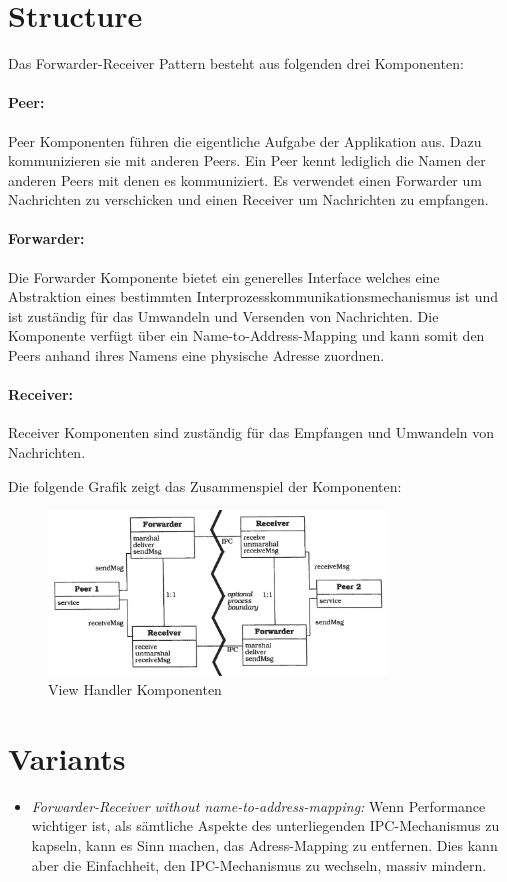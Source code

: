 \section{Structure}
Das Forwarder-Receiver Pattern besteht aus folgenden drei Komponenten:
\paragraph{Peer:} Peer Komponenten führen die eigentliche Aufgabe der Applikation aus. Dazu kommunizieren sie mit anderen Peers. Ein Peer kennt lediglich die Namen der anderen Peers mit denen es kommuniziert. Es verwendet einen Forwarder um Nachrichten zu verschicken und einen Receiver um Nachrichten zu empfangen.

\paragraph{Forwarder:} Die Forwarder Komponente bietet ein generelles Interface welches eine Abstraktion eines bestimmten Interprozesskommunikationsmechanismus ist und ist zuständig für das Umwandeln und Versenden von Nachrichten. Die Komponente verfügt über ein Name-to-Address-Mapping und kann somit den Peers anhand ihres Namens eine physische Adresse zuordnen.

\paragraph{Receiver:} Receiver Komponenten sind zuständig für das Empfangen und Umwandeln von Nachrichten.

\medskip
Die folgende Grafik zeigt das Zusammenspiel der Komponenten:
\begin{figure}[H]
	\centering
	\includegraphics[width=0.8\textwidth]{figures/11-forwarder-receiver-1.png}
	\caption{View Handler Komponenten}
\end{figure}


\section{Variants}
\begin{itemize}
	\item \textit{Forwarder-Receiver without name-to-address-mapping:} Wenn Performance wichtiger ist, als sämtliche Aspekte des unterliegenden IPC-Mechanismus zu kapseln, kann es Sinn machen, das Adress-Mapping zu entfernen. Dies kann aber die Einfachheit, den IPC-Mechanismus zu wechseln, massiv mindern.
\end{itemize}


